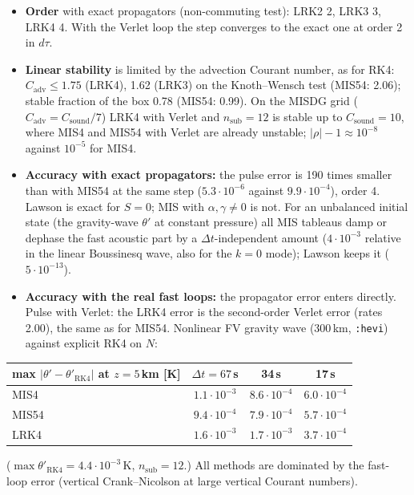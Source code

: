 \documentclass[11pt,a4paper]{article}
\newcommand{\code}[1]{\texttt{#1}}
\newcommand{\dt}{\Delta t}
\begin{document}
\begin{itemize}
\item \textbf{Order} with exact propagators (non-commuting test): LRK2 2, LRK3 3, LRK4 4. With the
  Verlet loop the step converges to the exact one at order 2 in $d\tau$.
\item \textbf{Linear stability} is limited by the advection Courant number, as for RK4:
  $C_\mathrm{adv}\le1.75$ (LRK4), 1.62 (LRK3) on the Knoth--Wensch test (MIS54: 2.06); stable fraction
  of the box 0.78 (MIS54: 0.99). On the MISDG grid ($C_\mathrm{adv} = C_\mathrm{sound}/7$) LRK4 with
  Verlet and $n_\mathrm{sub} = 12$ is stable up to $C_\mathrm{sound} = 10$, where MIS4 and MIS54 with
  Verlet are already unstable; $|\rho|-1\approx10^{-8}$ against $10^{-5}$ for MIS4.
\item \textbf{Accuracy with exact propagators:} the pulse error is 190 times smaller than with MIS54
  at the same step ($5.3\cdot10^{-6}$ against $9.9\cdot10^{-4}$), order 4. Lawson is exact for
  $S = 0$; MIS with $\alpha,\gamma\ne0$ is not. For an unbalanced initial state (the gravity-wave
  $\theta'$ at constant pressure) all MIS tableaus damp or dephase the fast acoustic part by a
  $\dt$-independent amount ($4\cdot10^{-3}$ relative in the linear Boussinesq wave, also for the
  $k = 0$ mode); Lawson keeps it ($5\cdot10^{-13}$).
\item \textbf{Accuracy with the real fast loops:} the propagator error enters directly. Pulse with
  Verlet: the LRK4 error is the second-order Verlet error (rates 2.00), the same as for MIS54.
  Nonlinear FV gravity wave (300\,km, \code{:hevi}) against explicit RK4 on $N$:
\end{itemize}
\begin{center}
\begin{tabular}{lccc}
\toprule
max $|\theta'-\theta'_\mathrm{RK4}|$ at $z = 5$\,km [K] & $\dt = 67$\,s & 34\,s & 17\,s\\
\midrule
MIS4  & $1.1\cdot10^{-3}$ & $8.6\cdot10^{-4}$ & $6.0\cdot10^{-4}$\\
MIS54 & $9.4\cdot10^{-4}$ & $7.9\cdot10^{-4}$ & $5.7\cdot10^{-4}$\\
LRK4  & $1.6\cdot10^{-3}$ & $1.7\cdot10^{-3}$ & $3.7\cdot10^{-4}$\\
\bottomrule
\end{tabular}
\end{center}
($\max\theta'_\mathrm{RK4} = 4.4\cdot10^{-3}$\,K, $n_\mathrm{sub} = 12$.) All methods are dominated by
the fast-loop error (vertical Crank--Nicolson at large vertical Courant numbers).
\end{document}
